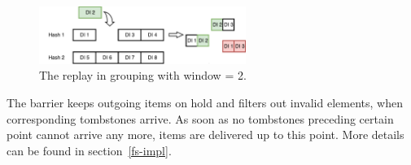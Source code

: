 \begin{figure}[ht]
  \centering
  \includegraphics[width=0.6\textwidth]{pics/grouping-replaying}
  \caption{The replay in grouping with window = 2. %
  }
  \label {grouping-replaying}
\end{figure}


The barrier  keeps outgoing items on hold and filters out invalid elements, when corresponding tombstones arrive. 
As soon as no tombstones preceding certain point cannot arrive any more, items are delivered  up to this point. 
%
More details can be found  in section~\ref{fs-impl}.



